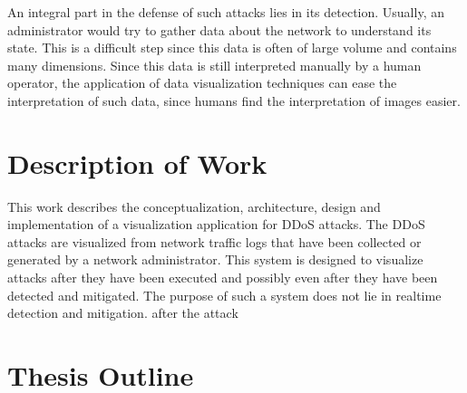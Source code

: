 An integral part in the defense of such attacks lies in its detection. Usually, an administrator would try to gather data about the network to understand its state. This is a difficult step since this data is often of large volume and contains many dimensions.
Since this data is still interpreted manually by a human operator, the application of data visualization techniques can ease the interpretation of such data, since humans find the interpretation of images easier\cite{wu}.


\section{Description of Work}
This work describes the conceptualization, architecture, design and implementation of a visualization application for DDoS attacks.
The DDoS attacks are visualized from network traffic logs that have been collected or generated by a network administrator. This system is designed to visualize attacks after they have been executed and possibly even after they have been detected and mitigated. The purpose of such a system does not lie in realtime detection and mitigation. 
after the attack

\section{Thesis Outline}

